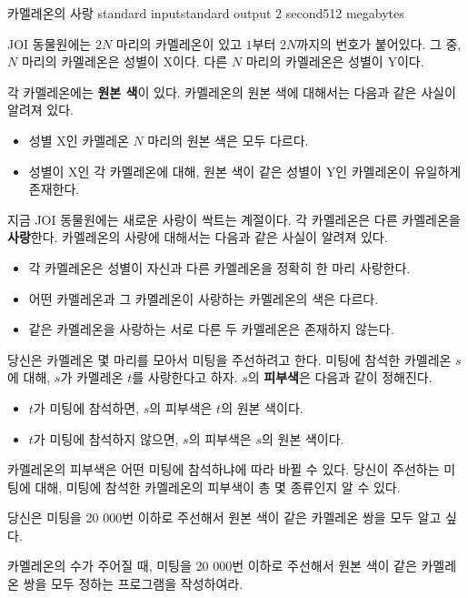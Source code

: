 \begin{problem}{카멜레온의 사랑}
	{standard input}{standard output}
	{2 second}{512 megabytes}{}
	
	JOI 동물원에는 $2N$ 마리의 카멜레온이 있고 $1$부터 $2N$까지의 번호가 붙어있다. 그 중, $N$ 마리의 카멜레온은 성별이 X이다. 다른 $N$ 마리의 카멜레온은 성별이 Y이다.
	
	각 카멜레온에는 \textbf{원본 색}이 있다. 카멜레온의 원본 색에 대해서는 다음과 같은 사실이 알려져 있다.
	
	\begin{itemize}
		\item 성별 X인 카멜레온 $N$ 마리의 원본 색은 모두 다르다.
		\item 성별이 X인 각 카멜레온에 대해, 원본 색이 같은 성별이 Y인 카멜레온이 유일하게 존재한다.
	\end{itemize}
	
	지금 JOI 동물원에는 새로운 사랑이 싹트는 계절이다. 각 카멜레온은 다른 카멜레온을 \textbf{사랑}한다. 카멜레온의 사랑에 대해서는 다음과 같은 사실이 알려져 있다.
	
	\begin{itemize}
		\item 각 카멜레온은 성별이 자신과 다른 카멜레온을 정확히 한 마리 사랑한다.
		\item 어떤 카멜레온과 그 카멜레온이 사랑하는 카멜레온의 색은 다르다.
		\item 같은 카멜레온을 사랑하는 서로 다른 두 카멜레온은 존재하지 않는다.
	\end{itemize}

	당신은 카멜레온 몇 마리를 모아서 미팅을 주선하려고 한다. 미팅에 참석한 카멜레온 $s$에 대해, $s$가 카멜레온 $t$를 사랑한다고 하자. $s$의 \textbf{피부색}은 다음과 같이 정해진다.
	
	\begin{itemize}
		\item $t$가 미팅에 참석하면, $s$의 피부색은 $t$의 원본 색이다.
		\item $t$가 미팅에 참석하지 않으면, $s$의 피부색은 $s$의 원본 색이다.
	\end{itemize}

	카멜레온의 피부색은 어떤 미팅에 참석하냐에 따라 바뀔 수 있다. 당신이 주선하는 미팅에 대해, 미팅에 참석한 카멜레온의 피부색이 총 몇 종류인지 알 수 있다.
	
	당신은 미팅을 20 000번 이하로 주선해서 원본 색이 같은 카멜레온 쌍을 모두 알고 싶다.
	
	카멜레온의 수가 주어질 때, 미팅을 20 000번 이하로 주선해서 원본 색이 같은 카멜레온 쌍을 모두 정하는 프로그램을 작성하여라.
	

\end{problem}
